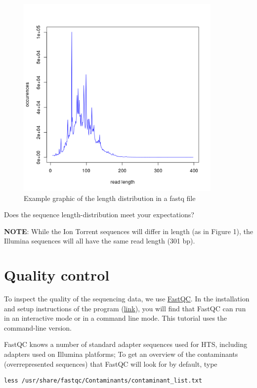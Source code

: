 \documentclass[11pt]{article}
\begin{document}
\begin{figure}[htb]
\centering
\includegraphics[width=10cm]{SequenceLengthDistribution.png}
\caption{Example graphic of the length distribution in a fastq file}
\end{figure}

Does the sequence length-distribution meet your expectations? 

\textbf{NOTE}: While the Ion Torrent sequences will differ in length (as in
Figure 1), the Illumina sequences will all have the same read length
(301 bp). 


\section{Quality control}
\label{sec-2}
To inspect the quality of the sequencing data, we use
\href{http://www.bioinformatics.babraham.ac.uk/projects/fastqc/}{FastQC}. In
the installation and setup instructions of the program
(\href{http://www.bioinformatics.babraham.ac.uk/projects/fastqc/INSTALL.txt}{link}),
you will find that FastQC can run in an interactive mode or in a
command line mode. This tutorial uses the command-line version.

FastQC knows a number of standard adapter sequences used for HTS,
including adapters used on Illumina platforms; To get an overview of
the contaminants (overrepresented sequences) that FastQC will look
for by default, type

\begin{verbatim}
less /usr/share/fastqc/Contaminants/contaminant_list.txt
\end{verbatim}
\end{document}
